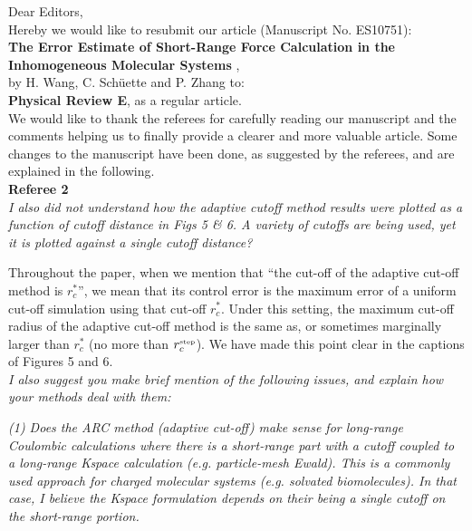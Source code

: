 \documentclass[a4paper]{article}
\begin{document}
\noindent
{Dear Editors,}\\

Hereby we would like to resubmit our article
(Manuscript No. ES10751):\\

\textbf{The Error Estimate of Short-Range Force Calculation in the Inhomogeneous Molecular Systems
},\\

by H. Wang, C. Sch\"uette and P. Zhang to:\\

\textbf{Physical Review E}, as a regular article.\\

We would like to thank the referees for carefully reading our
manuscript and the comments helping us to finally provide a clearer
and more valuable article.  Some changes to the manuscript have been
done, as suggested by the
referees, and are explained in the following.\\

\textbf{Referee 2}\\

\textit{I also did not understand how the adaptive cutoff method results were
plotted as a function of cutoff distance in Figs 5 \& 6. A variety of
cutoffs are being used, yet it is plotted against a single cutoff
distance?}

Throughout the paper, when we mention
that ``the cut-off of
the adaptive cut-off method is $r_c^\ast$'', we mean that its
control error is the maximum error of a uniform cut-off simulation
using that cut-off $r_c^\ast$.
Under this setting,  the maximum 
cut-off radius of the adaptive cut-off method is the same as,
or sometimes marginally larger  than
$r_c^\ast$ (no more than $r_c^{\textrm{\tiny{step}}}$).
We have made this point clear in the captions of Figures 5 and 6.
\\

\textit{
I also suggest you make brief mention of the following issues, and
explain how your methods deal with them:
}

\textit{
(1) Does the ARC method (adaptive cut-off) make sense for long-range
Coulombic calculations where there is a short-range part with a cutoff
coupled to a long-range Kspace calculation (e.g. particle-mesh Ewald).
This is a commonly used approach for charged molecular systems (e.g.
solvated biomolecules). In that case, I believe the Kspace formulation
depends on their being a single cutoff on the short-range portion.
}
\end{document}
